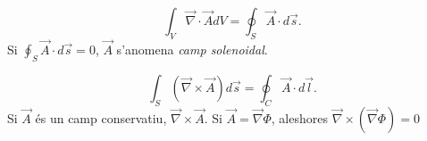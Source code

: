 \begin{teo}
    \[
    \int_V\vec{\nabla}\cdot\vec{A}dV=\oint_S\vec{A}\cdot d\vec{s}.
    \]
    Si $\oint_S\vec{A}\cdot d\vec{s}=0$, $\vec{A}$ s'anomena \textit{camp solenoidal}.
\end{teo}

\begin{teo}
	\[
	\int_S(\vec{\nabla}\times\vec{A})d\vec{s}=\oint_C\vec{A}\cdot d\vec{l}.\]
	Si $\vec{A}$ és un camp conservatiu, $\vec{\nabla}\times\vec{A}$. Si $\vec{A}=\vec{\nabla}\Phi$, aleshores $\vec{\nabla}\times(\vec{\nabla}\Phi)=0$
\end{teo}